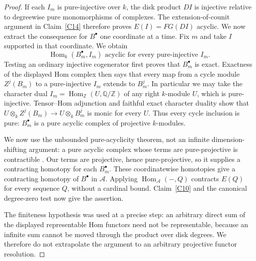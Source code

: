 \begin{proof}
If each $I_m$ is pure-injective over $k$, the disk product $DI$ is injective relative to degreewise pure monomorphisms of complexes. The extension-of-counit argument in Claim~\ref{C14} therefore proves $E(I)=FG(DI)$ acyclic. We now extract the consequence for $B^\bullet$ one coordinate at a time. Fix $m$ and take $I$ supported in that coordinate. We obtain
\[
 \operatorname{Hom}_k(B^\bullet_m,I_m)
 \text{ acyclic for every pure-injective }I_m.
\]
Testing an ordinary injective cogenerator first proves that $B^\bullet_m$ is exact. Exactness of the displayed Hom complex then says that every map from a cycle module $Z^j(B_m)$ to a pure-injective $I_m$ extends to $B_m^j$. In particular we may take the character dual $I_m=\operatorname{Hom}_{\mathbb Z}(U,\mathbb Q/\mathbb Z)$ of any right $k$-module $U$, which is pure-injective. Tensor--Hom adjunction and faithful exact character duality show that $U\otimes_kZ^j(B_m)\to U\otimes_kB_m^j$ is monic for every $U$. Thus every cycle inclusion is pure: $B_m^\bullet$ is a pure acyclic complex of projective $k$-modules.

We now use the unbounded pure-acyclicity theorem, not an infinite dimension-shifting argument: a pure acyclic complex whose terms are pure-projective is contractible \citep[Theorem 5.4 and Corollary 5.5]{Stovicek2014C}. Our terms are projective, hence pure-projective, so it supplies a contracting homotopy for each $B_m^\bullet$. These coordinatewise homotopies give a contracting homotopy of $B^\bullet$ in $\mathcal A$. Applying $\operatorname{Hom}_{\mathcal A}(-,Q)$ contracts $E(Q)$ for every sequence $Q$, without a cardinal bound. Claim~\ref{C10} and the canonical degree-zero test now give the assertion.

The finiteness hypothesis was used at a precise step: an arbitrary direct sum of the displayed representable Hom functors need not be representable, because an infinite sum cannot be moved through the product over disk degrees. We therefore do not extrapolate the argument to an arbitrary projective functor resolution.
\end{proof}

